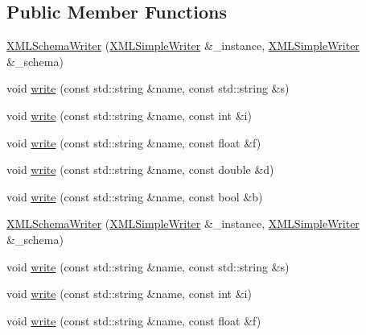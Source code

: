 \subsection*{Public Member Functions}
\begin{DoxyCompactItemize}
\item 
\mbox{\hyperlink{classXMLWriterAPI_1_1XMLSchemaWriter_a2284f6d1214940974d547c380e1ecfc8}{X\+M\+L\+Schema\+Writer}} (\mbox{\hyperlink{classXMLWriterAPI_1_1XMLSimpleWriter}{X\+M\+L\+Simple\+Writer}} \&\+\_\+instance, \mbox{\hyperlink{classXMLWriterAPI_1_1XMLSimpleWriter}{X\+M\+L\+Simple\+Writer}} \&\+\_\+schema)
\item 
void \mbox{\hyperlink{classXMLWriterAPI_1_1XMLSchemaWriter_a1922edfcbb9d52c70949fd8c8dd97569}{write}} (const std\+::string \&name, const std\+::string \&s)
\item 
void \mbox{\hyperlink{classXMLWriterAPI_1_1XMLSchemaWriter_a1b951af62e2106b76e33022c0f1b5d88}{write}} (const std\+::string \&name, const int \&i)
\item 
void \mbox{\hyperlink{classXMLWriterAPI_1_1XMLSchemaWriter_affbcfbac63240a8048b6b0940cc05c30}{write}} (const std\+::string \&name, const float \&f)
\item 
void \mbox{\hyperlink{classXMLWriterAPI_1_1XMLSchemaWriter_aaa0138613c826e77a63e5195bc742f07}{write}} (const std\+::string \&name, const double \&d)
\item 
void \mbox{\hyperlink{classXMLWriterAPI_1_1XMLSchemaWriter_a0d6bf66ccbb217c4db704568f9c377fe}{write}} (const std\+::string \&name, const bool \&b)
\item 
\mbox{\hyperlink{classXMLWriterAPI_1_1XMLSchemaWriter_a2284f6d1214940974d547c380e1ecfc8}{X\+M\+L\+Schema\+Writer}} (\mbox{\hyperlink{classXMLWriterAPI_1_1XMLSimpleWriter}{X\+M\+L\+Simple\+Writer}} \&\+\_\+instance, \mbox{\hyperlink{classXMLWriterAPI_1_1XMLSimpleWriter}{X\+M\+L\+Simple\+Writer}} \&\+\_\+schema)
\item 
void \mbox{\hyperlink{classXMLWriterAPI_1_1XMLSchemaWriter_a1922edfcbb9d52c70949fd8c8dd97569}{write}} (const std\+::string \&name, const std\+::string \&s)
\item 
void \mbox{\hyperlink{classXMLWriterAPI_1_1XMLSchemaWriter_a1b951af62e2106b76e33022c0f1b5d88}{write}} (const std\+::string \&name, const int \&i)
\item 
void \mbox{\hyperlink{classXMLWriterAPI_1_1XMLSchemaWriter_affbcfbac63240a8048b6b0940cc05c30}{write}} (const std\+::string \&name, const float \&f)
\item 

\end{DoxyCompactItemize}
